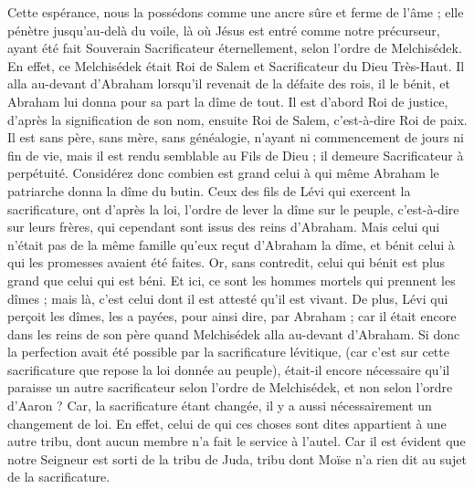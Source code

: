 \begin{multicols}{2}
Cette espérance, nous la possédons comme une ancre sûre et ferme de l'âme ; elle pénètre jusqu'au-delà du voile,
là où Jésus est entré comme notre précurseur, ayant été fait Souverain Sacrificateur éternellement, selon l'ordre de Melchisédek.
\VerseOne{}En effet, ce Melchisédek était Roi de Salem et Sacrificateur du Dieu Très-Haut. Il alla au-devant d'Abraham lorsqu'il revenait de la défaite des rois, il le bénit,
et Abraham lui donna pour sa part la dîme de tout. Il est d’abord Roi de justice, d’après la signification de son nom, ensuite Roi de Salem, c’est-à-dire Roi de paix.
Il est sans père, sans mère, sans généalogie, n'ayant ni commencement de jours ni fin de vie, mais il est rendu semblable au Fils de Dieu ; il demeure Sacrificateur à perpétuité.
Considérez donc combien est grand celui à qui même Abraham le patriarche donna la dîme du butin.
Ceux des fils de Lévi qui exercent la sacrificature, ont d’après la loi, l’ordre de lever la dîme sur le peuple, c'est-à-dire sur leurs frères, qui cependant sont issus des reins d'Abraham.
Mais celui qui n’était pas de la même famille qu’eux reçut d’Abraham la dîme, et bénit celui à qui les promesses avaient été faites.
Or, sans contredit, celui qui bénit est plus grand que celui qui est béni.
Et ici, ce sont les hommes mortels qui prennent les dîmes ; mais là, c’est celui dont il est attesté qu’il est vivant.
De plus, Lévi qui perçoit les dîmes, les a payées, pour ainsi dire, par Abraham ;
car il était encore dans les reins de son père quand Melchisédek alla au-devant d’Abraham.
Si donc la perfection avait été possible par la sacrificature lévitique, (car c'est sur cette sacrificature que repose la loi donnée au peuple), était-il encore nécessaire qu’il paraisse un autre sacrificateur selon l'ordre de Melchisédek, et non selon l'ordre d'Aaron ?
Car, la sacrificature étant changée, il y a aussi nécessairement un changement de loi.
En effet, celui de qui ces choses sont dites appartient à une autre tribu, dont aucun membre n'a fait le service à l'autel.
Car il est évident que notre Seigneur est sorti de la tribu de Juda, tribu dont Moïse n'a rien dit au sujet de la sacrificature.

\end{multicols}
